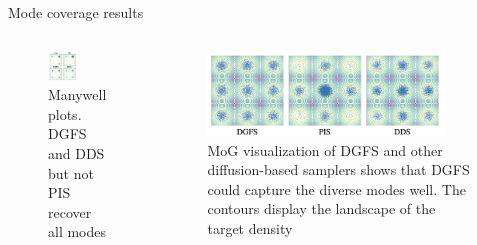 \documentclass[aspectratio=169,xcolor=dvipsnames]{beamer}
\begin{document}
\begin{frame}[t]{Mode coverage results}

\begin{columns}[t]
\begin{column}{0.48\textwidth}
\begin{figure}
    \centering
    \includegraphics[width=0.5\textwidth]{figures/mode.png}
    \caption{Manywell plots. DGFS and DDS but not PIS recover all modes}
\end{figure}
\end{column}
\begin{column}{0.48\textwidth}
\begin{figure}
    \centering
    \includegraphics[width=0.9\textwidth]{figures/MoG.png}
    \caption{MoG visualization of DGFS and other diffusion-based samplers shows that DGFS could capture the diverse modes well. The contours display the landscape of the target density}
\end{figure}
\end{column}
\end{columns}
    
\end{frame}
\end{document}
